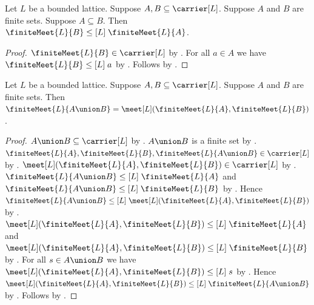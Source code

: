 \begin{proposition}\label{finite_meet_monotone}
    Let $L$ be a bounded lattice.
    Suppose $A,B\subseteq\carrier[L]$.
    Suppose $A$ and $B$ are finite sets.
    Suppose $A\subseteq B$.
    Then $\finiteMeet{L}{B}\mathrel{\leq[L]}\finiteMeet{L}{A}$.
\end{proposition}
\begin{proof}
    $\finiteMeet{L}{B}\in\carrier[L]$ by .
    For all $a\in A$ we have
        $\finiteMeet{L}{B}\mathrel{\leq[L]}a$ by
        .
    Follows by .
\end{proof}

\begin{proposition}\label{finite_meet_union}
    Let $L$ be a bounded lattice.
    Suppose $A,B\subseteq\carrier[L]$.
    Suppose $A$ and $B$ are finite sets.
    Then
        $\finiteMeet{L}{A\union B}
            =\meet[L](\finiteMeet{L}{A},\finiteMeet{L}{B})$.
\end{proposition}
\begin{proof}
    $A\union B\subseteq\carrier[L]$ by
        .
    $A\union B$ is a finite set by .
    $\finiteMeet{L}{A},\finiteMeet{L}{B},
        \finiteMeet{L}{A\union B}\in\carrier[L]$ by
        .
    $\meet[L](\finiteMeet{L}{A},\finiteMeet{L}{B})\in\carrier[L]$ by
        .
    $\finiteMeet{L}{A\union B}\mathrel{\leq[L]}
        \finiteMeet{L}{A}$ and
        $\finiteMeet{L}{A\union B}\mathrel{\leq[L]}
        \finiteMeet{L}{B}$ by
        .
    Hence $\finiteMeet{L}{A\union B}\mathrel{\leq[L]}
        \meet[L](\finiteMeet{L}{A},\finiteMeet{L}{B})$ by
        .
    $\meet[L](\finiteMeet{L}{A},\finiteMeet{L}{B})
        \mathrel{\leq[L]}\finiteMeet{L}{A}$ and
        $\meet[L](\finiteMeet{L}{A},\finiteMeet{L}{B})
        \mathrel{\leq[L]}\finiteMeet{L}{B}$ by
        .
    For all $s\in A\union B$ we have
        $\meet[L](\finiteMeet{L}{A},\finiteMeet{L}{B})
            \mathrel{\leq[L]}s$ by
        .
    Hence $\meet[L](\finiteMeet{L}{A},\finiteMeet{L}{B})
        \mathrel{\leq[L]}\finiteMeet{L}{A\union B}$ by
        .
    Follows by
        .
\end{proof}
